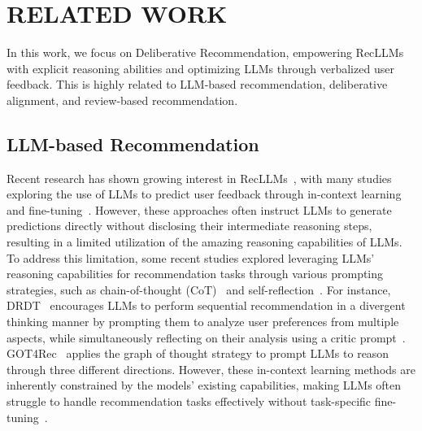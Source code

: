 \section{RELATED WORK}
In this work, we focus on Deliberative Recommendation, empowering RecLLMs with explicit reasoning abilities and optimizing LLMs through verbalized user feedback. This is highly related to LLM-based recommendation, deliberative alignment, and review-based recommendation. 

\subsection{LLM-based Recommendation}
Recent research has shown growing interest in RecLLMs~\cite{DBLP:journals/corr/abs-2410-19744}, with many studies exploring the use of LLMs to predict user feedback through in-context learning~\cite{chatgpt_CIKM,DBLP:conf/recsys/DaiSZYSXS0X23,DBLP:conf/recsys/SannerBRWD23} and fine-tuning~\cite{TallRec,Binllm,collm}. 
However, these approaches often instruct LLMs to generate predictions directly without disclosing their intermediate reasoning steps, resulting in a limited utilization of the amazing reasoning capabilities of LLMs.
To address this limitation, some recent studies explored leveraging LLMs' reasoning capabilities for recommendation tasks through various prompting strategies, such as chain-of-thought (CoT)~\cite{CoT} and self-reflection~\cite{DRDT}.
For instance, DRDT~\cite{DRDT} encourages LLMs to perform sequential recommendation in a divergent thinking manner by prompting them to analyze user preferences from multiple aspects, while simultaneously reflecting on their analysis using a critic prompt~\cite{DRDT}. 
GOT4Rec~\cite{GOT4Rec} applies the graph of thought strategy to prompt LLMs to reason through three different directions.
However, these in-context learning methods are inherently constrained by the models' existing capabilities, making LLMs often struggle to handle recommendation tasks effectively without task-specific fine-tuning~\cite{TallRec}.


